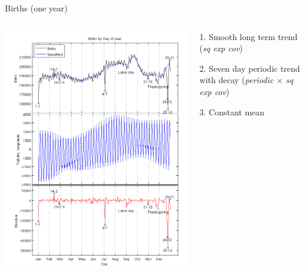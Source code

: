 \documentclass[11pt,ignorenonframetext,]{beamer}
\begin{document}
\begin{frame}{%
\protect\hypertarget{births-one-year}{%
Births (one year)}}

\begin{columns}
\begin{column}{0.5\textwidth}
\begin{center}
\includegraphics[width=\textwidth]{figs/births_pic1.png}
\end{center}
\end{column}
\begin{column}{0.5\textwidth}

1. Smooth long term trend \\ (\textit{sq exp cov})

\vspace{2mm}

2. Seven day periodic trend with decay (\textit{periodic $\times$ sq exp cov})

\vspace{2mm}

3. Constant mean

\end{column}
\end{columns}

\end{frame}
\end{document}
